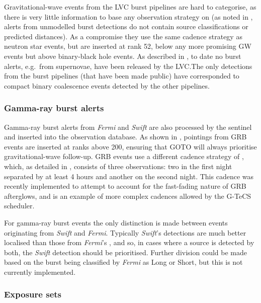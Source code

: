 \begin{colsection}
Gravitational-wave events from the LVC burst pipelines \citep{GW_burst} are hard to categorise, as there is very little information to base any observation strategy on (as noted in , alerts from unmodelled burst detections do not contain source classifications or predicted distances). As a compromise they use the same cadence strategy as neutron star events, but are inserted at rank 52, below any more promising GW events but above binary-black hole events. As described in , to date no burst alerts, e.g.\ from supernovae, have been released by the LVC.\@ The only detections from the burst pipelines (that have been made public) have corresponded to compact binary coalescence events detected by the other pipelines.

\subsubsection{Gamma-ray burst alerts}

Gamma-ray burst alerts from \textit{Fermi} and \textit{Swift} are also processed by the sentinel and inserted into the observation database. As shown in , pointings from GRB events are inserted at ranks above 200, ensuring that GOTO will always prioritise gravitational-wave follow-up. GRB events use a different cadence strategy of , which, as detailed in , consists of three observations: two in the first night separated by at least 4 hours and another on the second night. This cadence was recently implemented to attempt to account for the fast-fading nature of GRB afterglows, and is an example of more complex cadences allowed by the G-TeCS scheduler.

For gamma-ray burst events the only distinction is made between events originating from \textit{Swift} and \textit{Fermi}. Typically \textit{Swift}'s  detections are much better localised than those from \textit{Fermi}'s , and so, in cases where a source is detected by both, the \textit{Swift} detection should be prioritised. Further division could be made based on the burst being classified by \textit{Fermi} as Long or Short, but this is not currently implemented.

\subsubsection{Exposure sets}


\end{colsection}
